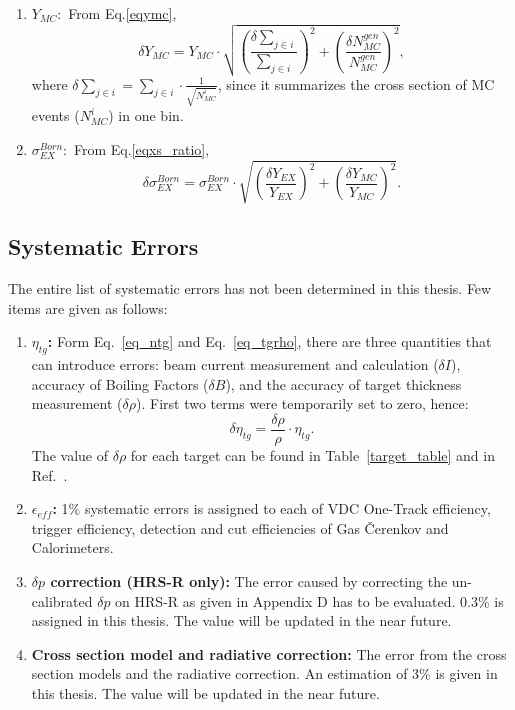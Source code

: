 \begin{enumerate}
\item \textbf{$Y_{MC}:$} From Eq.\ref{eqymc},
  \begin{equation}
    \delta Y_{MC} =  Y_{MC} \cdot \sqrt{\left(\frac{\delta\sum_{j\in i}}{\sum_{j\in i}}\right)^{2}+\left(\frac{\delta N_{MC}^{gen}}{N_{MC}^{gen}}\right)^{2}},
  \end{equation}
  where $\delta\sum_{j\in i} = \sum_{j\in i}\cdot\frac{1}{\sqrt{N_{MC}^{i}}}$, since it summarizes the cross section of MC events ($N_{MC}^{i}$) in one bin.

\item \textbf{$\sigma_{EX}^{Born}:$} From Eq.\ref{eqxs_ratio},
  \begin{equation}
    \delta \sigma_{EX}^{Born} = \sigma_{EX}^{Born} \cdot \sqrt{\left(\frac{\delta Y_{EX}}{Y_{EX}}\right)^{2}+\left(\frac{\delta Y_{MC}}{Y_{MC}}\right)^{2}}.
  \end{equation}

\end{enumerate}

\subsection{Systematic Errors}
 The entire list of systematic errors has not been determined in this thesis. Few items are given as follows:
\begin{enumerate}
\item \textbf{$\eta_{tg}$:}  Form Eq.~\eqref{eq_ntg} and Eq.~\eqref{eq_tgrho}, there are three quantities that can introduce errors: beam current measurement and calculation ($\delta I$), accuracy of Boiling Factors ($\delta B$), and the accuracy of target thickness measurement ($\delta \rho$). First two terms were temporarily set to zero, hence:
  \begin{equation}
    \delta \eta_{tg} = \frac{\delta\rho}{\rho} \cdot \eta_{tg}.
  \end{equation} 
The value of $\delta \rho$ for each target can be found in Table~\ref{target_table} and in Ref.~\cite{target_report}.
\item \textbf{$\epsilon_{eff}$:}  1\% systematic errors is assigned to each of VDC One-Track efficiency, trigger efficiency, detection and cut efficiencies of Gas \v{C}erenkov and Calorimeters.
\item \textbf{$\delta p$ correction (HRS-R only):} The error caused by correcting the un-calibrated $\delta p$ on HRS-R as given in Appendix D has to be evaluated. 0.3\% is assigned in this thesis. The value will be updated in the near future.
\item \textbf{Cross section model and radiative correction:} The error from the cross section models and the radiative correction. An estimation of 3\% is given in this thesis. The value will be updated in the near future.
\end{enumerate}